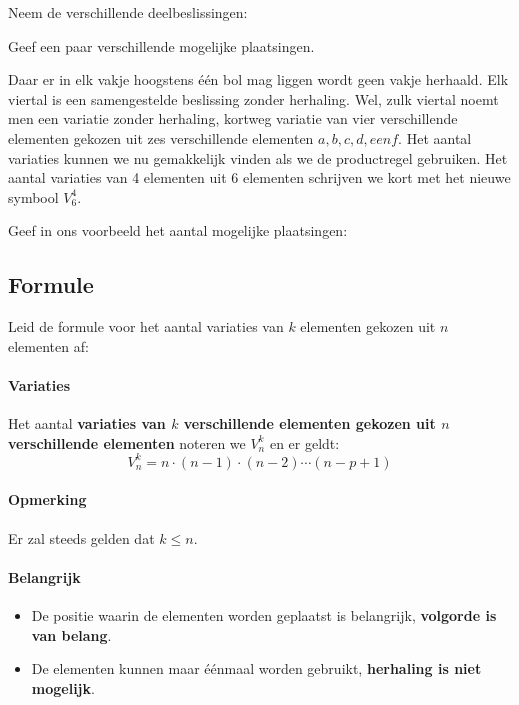 \documentclass[12pt,twoside]{article}
\begin{document}
\begin{oefening}
Neem de verschillende deelbeslissingen:
\end{oefening}

\begin{oefening}
Geef een paar verschillende mogelijke plaatsingen.
\vspace*{2cm}
\end{oefening}

Daar er in elk vakje hoogstens één bol mag liggen wordt geen vakje herhaald.
Elk viertal is een samengestelde beslissing zonder herhaling. Wel, zulk viertal
noemt men een variatie zonder herhaling, kortweg variatie van vier verschillende elementen gekozen uit zes verschillende elementen $a, b, c, d, e en f$.
Het aantal variaties kunnen we nu gemakkelijk vinden als we de
productregel gebruiken. Het aantal variaties van 4 elementen uit 6 elementen schrijven we kort met het nieuwe symbool $V^4_6$.

\begin{oefening}
Geef in ons voorbeeld het aantal mogelijke plaatsingen:
\end{oefening}

\subsection{Formule}

\begin{oefening}
Leid de formule voor het aantal variaties van $k$ elementen gekozen uit $n$ elementen af:
\end{oefening}

\paragraph*{Variaties}
\begin{mdframed}
Het aantal {\bf variaties van $k$ verschillende elementen gekozen uit $n$ verschillende elementen} noteren we $V^k_n$ en er geldt:
$$V^k_n=n\cdot (n-1) \cdot (n-2) \cdots (n-p+1)$$
\end{mdframed}

\paragraph*{Opmerking} Er zal steeds gelden dat $k\leq n$.

\paragraph*{Belangrijk}
\begin{itemize}
  \item De positie waarin de elementen worden geplaatst is belangrijk, {\bf volgorde is van belang}.
  \item De elementen kunnen maar éénmaal worden gebruikt, {\bf herhaling is niet mogelijk}.
\end{itemize}
\end{document}
